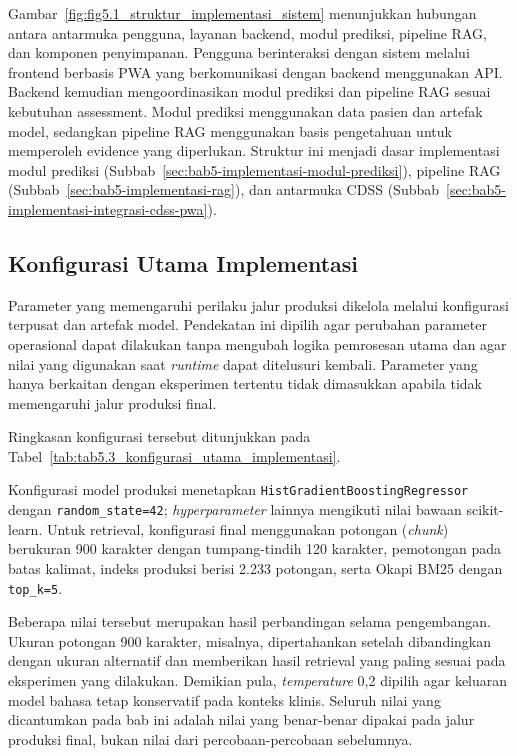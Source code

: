 Gambar~\ref{fig:fig5.1_struktur_implementasi_sistem} menunjukkan hubungan antara antarmuka pengguna, layanan backend, modul prediksi, pipeline RAG, dan komponen penyimpanan. 
Pengguna berinteraksi dengan sistem melalui frontend berbasis PWA yang berkomunikasi dengan backend menggunakan API. Backend kemudian mengoordinasikan modul prediksi dan 
pipeline RAG sesuai kebutuhan assessment. Modul prediksi menggunakan data pasien dan artefak model, sedangkan pipeline RAG menggunakan basis pengetahuan untuk memperoleh 
evidence yang diperlukan. Struktur ini menjadi dasar implementasi modul prediksi (Subbab~\ref{sec:bab5-implementasi-modul-prediksi}), pipeline RAG (Subbab~\ref{sec:bab5-implementasi-rag}), dan antarmuka CDSS (Subbab~\ref{sec:bab5-implementasi-integrasi-cdss-pwa}).

\subsection{Konfigurasi Utama Implementasi}
\label{subsec:bab5-konfigurasi-utama-implementasi}

Parameter yang memengaruhi perilaku jalur produksi dikelola melalui konfigurasi terpusat dan artefak model. Pendekatan ini dipilih agar perubahan parameter operasional
dapat dilakukan tanpa mengubah logika pemrosesan utama dan agar nilai yang digunakan saat \textit{runtime} dapat ditelusuri kembali. Parameter yang hanya berkaitan dengan
eksperimen tertentu tidak dimasukkan apabila tidak memengaruhi jalur produksi final.

Ringkasan konfigurasi tersebut ditunjukkan pada Tabel~\ref{tab:tab5.3_konfigurasi_utama_implementasi}.



Konfigurasi model produksi menetapkan \texttt{HistGradientBoostingRegressor} dengan \texttt{random\_state=42}; \textit{hyperparameter} lainnya mengikuti nilai bawaan
scikit-learn. Untuk retrieval, konfigurasi final menggunakan potongan (\textit{chunk}) berukuran 900 karakter dengan tumpang-tindih 120 karakter, pemotongan pada
batas kalimat, indeks produksi berisi 2.233 potongan, serta Okapi BM25 dengan \texttt{top\_k=5}.

Beberapa nilai tersebut merupakan hasil perbandingan selama pengembangan. Ukuran potongan 900 karakter, misalnya, dipertahankan setelah dibandingkan dengan ukuran
alternatif dan memberikan hasil retrieval yang paling sesuai pada eksperimen yang dilakukan. Demikian pula, \textit{temperature} 0,2 dipilih agar keluaran model bahasa
tetap konservatif pada konteks klinis. Seluruh nilai yang dicantumkan pada bab ini adalah nilai yang benar-benar dipakai pada jalur produksi final, bukan nilai dari
percobaan-percobaan sebelumnya.

